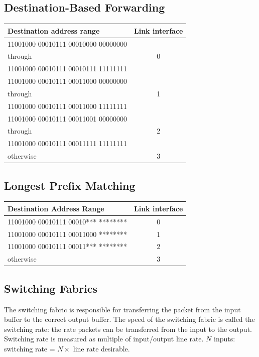 \documentclass[12pt]{article}
\begin{document}
	\subsection{Destination-Based Forwarding}
	\begin{center}
		\begin{tabular}{|l|c|}
			\hline
			\textbf{Destination address range} & Link interface\\
			\hline
			11001000 00010111 00010000 00000000 & \\through & 0\\11001000 00010111 00010111 11111111 & \\
			\hline
			11001000 00010111 00011000 00000000 & \\
			through & 1\\
			11001000 00010111 00011000 11111111 & \\
			\hline
			11001000 00010111 00011001 00000000 & \\
			through & 2\\
			11001000 00010111 00011111 11111111 & \\
			\hline
			otherwise & 3\\
			\hline
		\end{tabular}
	\end{center}
	\subsection{Longest Prefix Matching}
	\begin{center}
		\begin{tabular}{|l|c|}
			\hline
			\textbf{Destination Address Range} & Link interface\\
			\hline
			11001000 00010111 00010*** ******** & 0\\
			\hline 
			11001000 00010111 00011000 ******** & 1\\
			\hline
			11001000 00010111 00011*** ******** & 2\\
			\hline
			otherwise & 3\\
			\hline
		\end{tabular}
	\end{center}
	\subsection{Switching Fabrics}
	The switching fabric is responsible for transferring the packet from the input buffer to the correct output buffer. The speed of the switching fabric is called the switching rate: the rate packets can be transferred from the input to the output. Switching rate is measured as multiple of input/output line rate. $N$ inputs: switching rate = $N \times $ line rate desirable.
\end{document}
